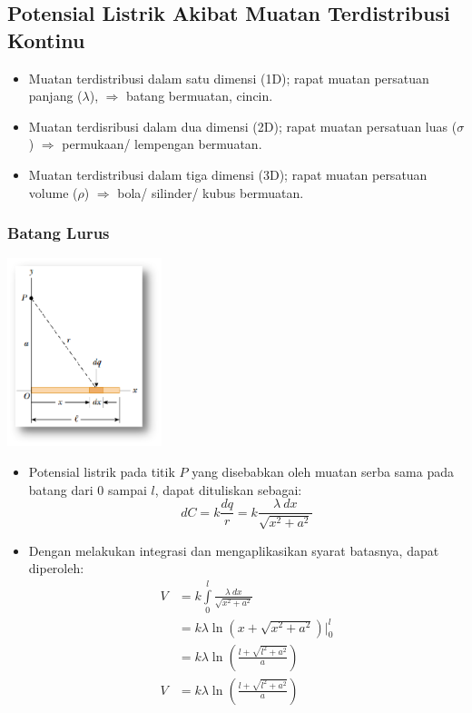 \documentclass[twocolumn, 11pt]{article}%
\begin{document}
     \subsection{Potensial Listrik Akibat Muatan Terdistribusi Kontinu}%
     \begin{itemize}
         \item Muatan terdistribusi dalam satu dimensi (1D); rapat muatan persatuan panjang ($\lambda$), $\Rightarrow$ batang bermuatan, cincin.
         \item Muatan terdisribusi dalam dua dimensi (2D); rapat muatan persatuan luas ($\sigma$) $\Rightarrow$ permukaan/ lempengan bermuatan.
         \item Muatan terdistribusi dalam tiga dimensi (3D); rapat muatan persatuan volume ($\rho$) $\Rightarrow$ bola/ silinder/ kubus bermuatan.
     \end{itemize}

     \subsubsection{Batang Lurus}%
     \begin{center}
         \includegraphics[width=170px]{12.png}
     \end{center}
     \begin{itemize}
         \item Potensial listrik pada titik $P$ yang disebabkan oleh muatan serba sama pada batang dari $0$ sampai $l$, dapat dituliskan sebagai:
             \[dC=k\frac{dq}r=k\frac{\lambda\ dx}{\sqrt{x^2+a^2}} \]
        \item Dengan melakukan integrasi dan mengaplikasikan syarat batasnya, dapat diperoleh:
            \begin{align*}
                V&=k\int\limits_0^l \frac{\lambda\ dx}{\sqrt{x^2+a^2}}\\
                 &=k\lambda\ln\left(x+\sqrt{x^2+a^2}\right)\bigg|_0^l\\
                 &=k\lambda\ln\left(\frac{l+\sqrt{l^2+a^2}}a\right)\\
                V&=k\lambda\ln\left(\frac{l+\sqrt{l^2+a^2}}a\right)
            \end{align*}
     \end{itemize}
\end{document}
